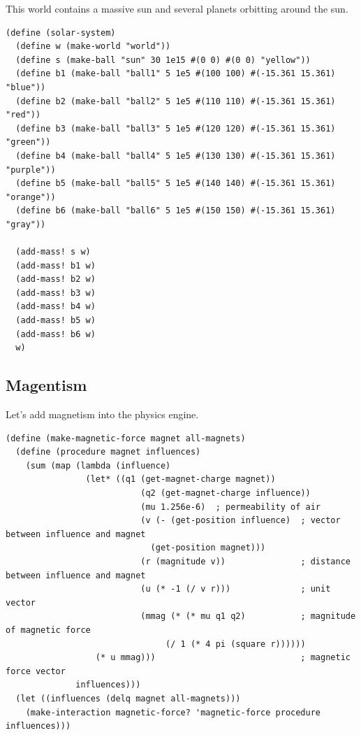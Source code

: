 \documentclass{article}
\begin{document}
This world contains a massive sun and several planets orbitting around the sun.
{\small\begin{verbatim}
(define (solar-system)
  (define w (make-world "world"))
  (define s (make-ball "sun" 30 1e15 #(0 0) #(0 0) "yellow"))
  (define b1 (make-ball "ball1" 5 1e5 #(100 100) #(-15.361 15.361) "blue"))
  (define b2 (make-ball "ball2" 5 1e5 #(110 110) #(-15.361 15.361) "red"))
  (define b3 (make-ball "ball3" 5 1e5 #(120 120) #(-15.361 15.361) "green"))
  (define b4 (make-ball "ball4" 5 1e5 #(130 130) #(-15.361 15.361) "purple"))
  (define b5 (make-ball "ball5" 5 1e5 #(140 140) #(-15.361 15.361) "orange"))
  (define b6 (make-ball "ball6" 5 1e5 #(150 150) #(-15.361 15.361) "gray"))

  (add-mass! s w)
  (add-mass! b1 w)
  (add-mass! b2 w)
  (add-mass! b3 w)
  (add-mass! b4 w)
  (add-mass! b5 w)
  (add-mass! b6 w)
  w)
\end{verbatim}}

\subsection{Magentism}
Let's add magnetism into the physics engine. 
{\small\begin{verbatim}
(define (make-magnetic-force magnet all-magnets)
  (define (procedure magnet influences)
    (sum (map (lambda (influence)
                (let* ((q1 (get-magnet-charge magnet))
                           (q2 (get-magnet-charge influence))
                           (mu 1.256e-6)  ; permeability of air
                           (v (- (get-position influence)  ; vector between influence and magnet
                             (get-position magnet)))
                           (r (magnitude v))               ; distance between influence and magnet
                           (u (* -1 (/ v r)))              ; unit vector
                           (mmag (* (* mu q1 q2)           ; magnitude of magnetic force
                                (/ 1 (* 4 pi (square r))))))
                  (* u mmag)))                             ; magnetic force vector
              influences)))
  (let ((influences (delq magnet all-magnets)))
    (make-interaction magnetic-force? 'magnetic-force procedure influences)))
\end{verbatim}}
\end{document}
